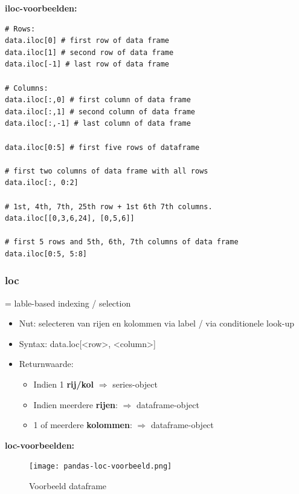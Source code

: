 \documentclass{article}
\begin{document}
\textbf{iloc-voorbeelden:}

\begin{verbatim}
# Rows:
data.iloc[0] # first row of data frame
data.iloc[1] # second row of data frame
data.iloc[-1] # last row of data frame

# Columns:
data.iloc[:,0] # first column of data frame
data.iloc[:,1] # second column of data frame
data.iloc[:,-1] # last column of data frame

data.iloc[0:5] # first five rows of dataframe

# first two columns of data frame with all rows
data.iloc[:, 0:2] 

# 1st, 4th, 7th, 25th row + 1st 6th 7th columns.
data.iloc[[0,3,6,24], [0,5,6]]  

# first 5 rows and 5th, 6th, 7th columns of data frame
data.iloc[0:5, 5:8]

\end{verbatim}

\subsubsection{loc}

= lable-based indexing / selection

\begin{itemize}
    \item Nut: selecteren van rijen en kolommen via label / via conditionele look-up
    \item Syntax: data.loc[<row>, <column>]
    \item Returnwaarde:
    \begin{itemize}
        \item Indien 1 \textbf{rij/kol} $\Rightarrow$ series-object
        \item Indien meerdere \textbf{rijen}: $\Rightarrow$ dataframe-object
        \item 1 of meerdere \textbf{kolommen}: $\Rightarrow$ dataframe-object 
    \end{itemize}
\end{itemize}


\textbf{loc-voorbeelden:}

\begin{figure}[H]
    \centering
    \texttt{[image: pandas-loc-voorbeeld.png]}
    \caption{Voorbeeld dataframe}
\end{figure}
\end{document}
